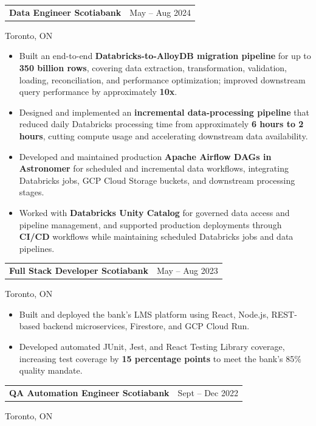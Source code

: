 \documentclass[10pt,letterpaper]{extarticle}
\makeatletter
\newcommand{\entry}[2]{%
  \vspace{2.5pt}%
  \noindent
  \begin{tabular*}{\textwidth}{@{}l@{\extracolsep{\fill}}r@{}}
    \textbf{#1} & {\color{muted}\small #2} \\
  \end{tabular*}
  \par\vspace{-1pt}%
}
\newcommand{\meta}[1]{%
  {\color{muted}\small #1}\par\vspace{1pt}%
}
\makeatother
\begin{document}
\entry{Data Engineer \textnormal{\textbar} Scotiabank}
{May -- Aug 2024}
\meta{Toronto, ON}

\begin{itemize}
\item Built an end-to-end \textbf{Databricks-to-AlloyDB migration pipeline} for up to \textbf{350 billion rows}, covering data extraction, transformation, validation, loading, reconciliation, and performance optimization; improved downstream query performance by approximately \textbf{10x}.

\item Designed and implemented an \textbf{incremental data-processing pipeline} that reduced daily Databricks processing time from approximately \textbf{6 hours to 2 hours}, cutting compute usage and accelerating downstream data availability.

\item Developed and maintained production \textbf{Apache Airflow DAGs in Astronomer} for scheduled and incremental data workflows, integrating Databricks jobs, GCP Cloud Storage buckets, and downstream processing stages.

\item Worked with \textbf{Databricks Unity Catalog} for governed data access and pipeline management, and supported production deployments through \textbf{CI/CD} workflows while maintaining scheduled Databricks jobs and data pipelines.
\end{itemize}


\entry{Full Stack Developer \textnormal{\textbar} Scotiabank}
{May -- Aug 2023}
\meta{Toronto, ON}

\begin{itemize}
\item Built and deployed the bank's LMS platform using React, Node.js, REST-based backend microservices, Firestore, and GCP Cloud Run.

\item Developed automated JUnit, Jest, and React Testing Library coverage, increasing test coverage by \textbf{15 percentage points} to meet the bank's 85\% quality mandate.
\end{itemize}

\entry{QA Automation Engineer \textnormal{\textbar} Scotiabank}
{Sept -- Dec 2022}
\meta{Toronto, ON}
\end{document}
